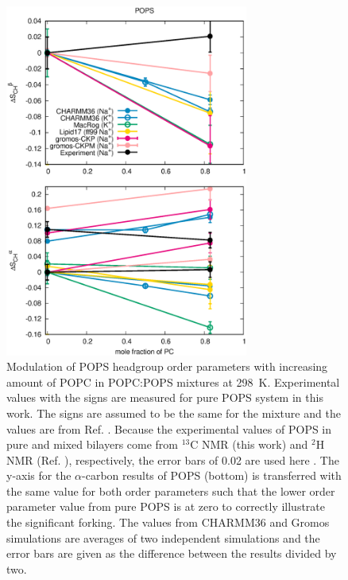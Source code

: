 \documentclass[aps,prl,superscriptaddress,twocolumn]{revtex4}
\begin{document}
\begin{figure}[!tb]
  \centering
  \includegraphics[width=8.0cm]{../Figs/HGorderparametersPSvsPC.eps}
  \caption{\label{HGorderparametersPSvsPC}
    Modulation of POPS headgroup order parameters with increasing amount of POPC in POPC:POPS mixtures at 298~K.
    Experimental values with the signs are measured for pure POPS system in this work.
    The signs are assumed to be the same for the mixture and the values are from Ref. .
    Because the experimental values of POPS in pure and mixed bilayers come from $^{13}$C NMR (this work) and $^2$H NMR (Ref. ), respectively,
    the error bars of 0.02 are used here \cite{botan15,ollila16}.
    The y-axis for the $\alpha$-carbon results of POPS (bottom) is transferred
    with the same value for both order parameters such that the lower order
    parameter value from pure POPS is at zero to correctly illustrate the significant forking.
    The values from CHARMM36 and Gromos simulations are averages of two independent simulations and
    the error bars are given as the difference between the results divided by two.
  }
\end{figure}
\end{document}
